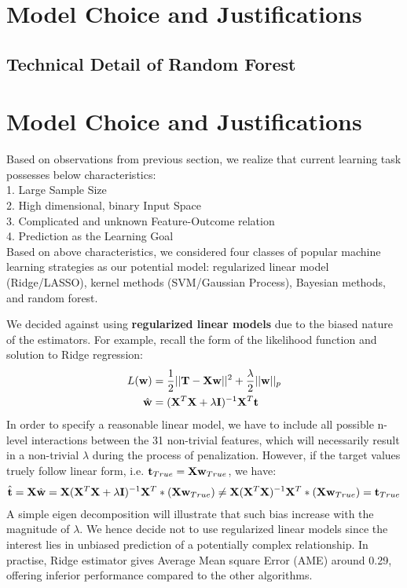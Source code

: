 \documentclass[11pt]{article}
\theoremstyle{definition}
\begin{document}
\section{\textbf{Model Choice and Justifications}}




\subsection{\textbf{Technical Detail of Random Forest}}







\newpage
\section{\textbf{Model Choice and Justifications}}
Based on observations from previous section, we realize that current learning task possesses below characteristics:\\

1. Large Sample Size\\
2. High dimensional, binary Input Space\\
3. Complicated and unknown Feature-Outcome relation\\
4. Prediction as the Learning Goal\\

Based on above characteristics, we considered four classes of popular machine learning strategies as our potential model: regularized linear model (Ridge/LASSO), kernel methods (SVM/Gaussian Process), Bayesian methods, and random forest.

We decided against using \textbf{regularized linear models} due to the biased nature of the estimators. For example, recall the form of the likelihood function and solution to Ridge regression:
\begin{align*}
L({\bf w}) &= \frac{1}{2} || {\bf T} - {\bf X}{\bf w}||^2 + \frac{\lambda}{2}||{\bf w}||_p\\
\hat{{\bf w}} &= ({\bf X}^T{\bf X} + \lambda {\bf I})^{-1}{\bf X}^T{\bf t}
\end{align*}
In order to specify a reasonable linear model, we have to include all possible n-level interactions between the 31 non-trivial features, which will necessarily result in a non-trivial $\lambda$ during the process of penalization. However, if the target values truely follow linear form, i.e. ${\bf t}_{True} = {\bf X} {\bf w}_{True}$, we have:
\begin{align*}
\hat{{\bf t}} = {\bf X}\hat{{\bf w}} =  {\bf X}({\bf X}^T{\bf X} + \lambda {\bf I})^{-1}{\bf X}^T * ({\bf X} {\bf w}_{True}) \neq  {\bf X}({\bf X}^T{\bf X})^{-1}{\bf X}^T * ({\bf X} {\bf w}_{True}) = {\bf t}_{True} 
\end{align*}
A simple eigen decomposition will illustrate that such bias increase with the magnitude of $\lambda$. We hence decide not to use regularized linear models since the interest lies in unbiased prediction of a potentially complex relationship. In practise, Ridge estimator gives Average Mean square Error (AME) around 0.29, offering inferior performance compared to the other algorithms.
\end{document}
